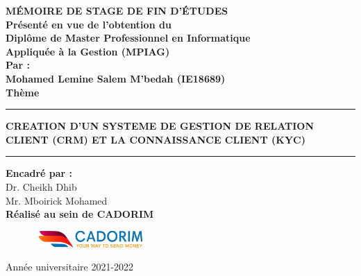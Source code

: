 \documentclass[a4paper, 12pt]{report}
\begin{document}
\begin{titlepage}
\begin{center}
			\bf{MÉMOIRE DE STAGE DE FIN D'ÉTUDES} \\
			\vspace{1cm}
			{\bf Présenté en vue de l’obtention du } \vspace{-0.2cm}\\
			{\bf Diplôme de Master Professionnel en Informatique}\vspace{-0.2cm}\\
				{\bf	Appliquée à la Gestion (MPIAG)}\\ \vspace{0.2cm}
				{\bf Par :}\\ \vspace{0.2cm}
					{\bf Mohamed Lemine Salem M’bedah (IE18689) }\\ \vspace{0.2cm}
			\huge{\textbf{Thème}}\\ 
			\noindent\rule{\textwidth}{1mm}
			\Large{\bf{CREATION D’UN SYSTEME DE GESTION DE RELATION CLIENT (CRM) ET LA CONNAISSANCE CLIENT (KYC)}}
			\noindent\rule{\textwidth}{1mm}
		\end{center}
		\vspace{0cm}
		\begin{center}
			
			{\bf Encadré par :}\\
			{Dr. Cheikh Dhib} \\
			{Mr. Mboirick Mohamed} \\
			{\bf Réalisé au sein de CADORIM }
			
			
		\end{center}
		\begin{figure}[htbp]
		\hbox{
			\hspace*{5cm}
			\includegraphics[width=150px]{./Template LaTeX/Images/cado_logo.png}
		}
		\end{figure}
		
		\begin{center}
			Année universitaire 2021-2022
		\end{center}
	\end{titlepage}
\end{document}
